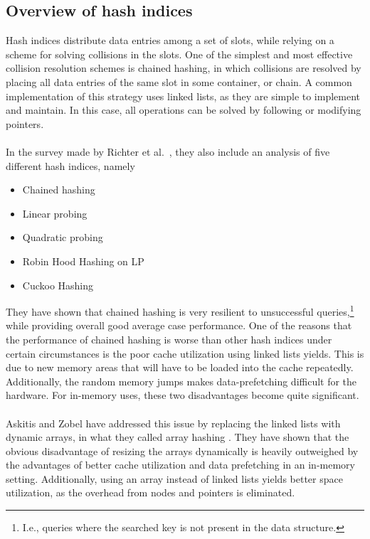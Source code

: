 \documentclass[11pt]{report} %
\begin{document}
\subsection{Overview of hash indices}
\label{subsec:background_review_of_hash_indices}
Hash indices distribute data entries among a set of slots, while relying on a scheme for solving collisions in the slots. One of the simplest and most effective collision resolution schemes is chained hashing, in which collisions are resolved by placing all data entries of the same slot in some container, or chain. A common implementation of this strategy uses linked lists, as they are simple to implement and maintain. In this case, all operations can be solved by following or modifying pointers. \\
\\
In the survey made by Richter et al.~\cite{RAD15}, they also include an analysis of five different hash indices, namely
\begin{itemize}
  \item Chained hashing
  \item Linear probing
  \item Quadratic probing
  \item Robin Hood Hashing on LP
  \item Cuckoo Hashing
\end{itemize}
They have shown that chained hashing is very resilient to unsuccessful queries,\footnote{I.e., queries where the searched key is not present in the data structure.} while providing overall good average case performance. One of the reasons that the performance of chained hashing is worse than other hash indices under certain circumstances is the poor cache utilization using linked lists yields. This is due to new memory areas that will have to be loaded into the cache repeatedly. Additionally, the random memory jumps makes data-prefetching difficult for the hardware. For in-memory uses, these two disadvantages become quite significant. \\
\\
Askitis and Zobel have addressed this issue by replacing the linked lists with dynamic arrays, in what they called array hashing \cite{NA09, AJ05}. They have shown that the obvious disadvantage of resizing the arrays dynamically is heavily outweighed by the advantages of better cache utilization and data prefetching in an in-memory setting. Additionally, using an array instead of linked lists yields better space utilization, as the overhead from nodes and pointers is eliminated. \\
\end{document}

